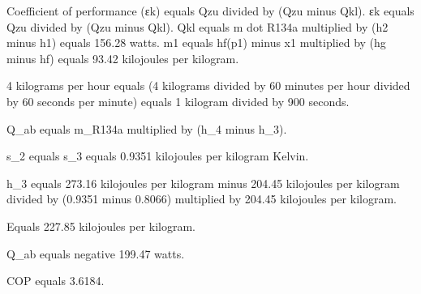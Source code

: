 Coefficient of performance (εk) equals Qzu divided by (Qzu minus Qkl).  
εk equals Qzu divided by (Qzu minus Qkl).  
Qkl equals m dot R134a multiplied by (h2 minus h1) equals 156.28 watts.  
m1 equals hf(p1) minus x1 multiplied by (hg minus hf) equals 93.42 kilojoules per kilogram.  

4 kilograms per hour equals (4 kilograms divided by 60 minutes per hour divided by 60 seconds per minute) equals 1 kilogram divided by 900 seconds.

Q_ab equals m_R134a multiplied by (h_4 minus h_3).  

s_2 equals s_3 equals 0.9351 kilojoules per kilogram Kelvin.  

h_3 equals 273.16 kilojoules per kilogram minus 204.45 kilojoules per kilogram divided by (0.9351 minus 0.8066) multiplied by 204.45 kilojoules per kilogram.  

Equals 227.85 kilojoules per kilogram.  

Q_ab equals negative 199.47 watts.  

COP equals 3.6184.